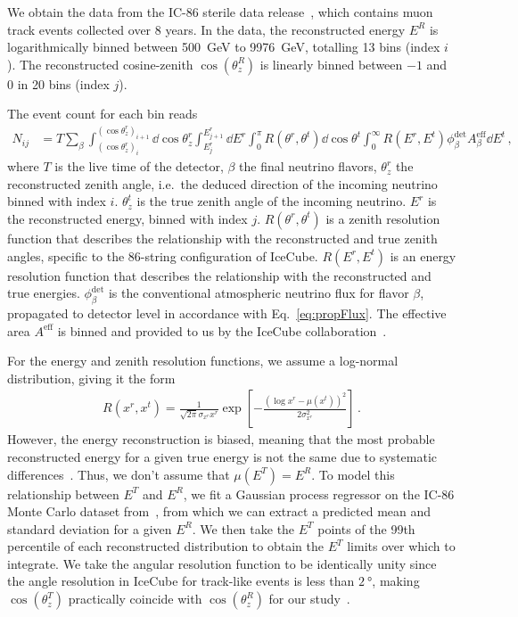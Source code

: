 \documentclass{article}
\newcommand{\zreco}{\ensuremath{\cos{(\theta_z^{R})}}}
\newcommand{\ztrue}{\ensuremath{\cos{(\theta_z^{T})}}}
\newcommand{\Ereco}{E^{R}}
\newcommand{\Etrue}{E^{T}}
\begin{document}
We obtain the data from the IC-86 sterile data release~\cite{IC2020}, which contains muon track events collected over 8 years. 
In the data, the reconstructed energy $\Ereco$ is logarithmically binned between \SI{500}{\GeV} to \SI{9976}{\GeV}, totalling 13 bins (index $i$).
The reconstructed cosine-zenith $\zreco$ is linearly binned between $-1$ and $0$ in 20 bins (index $j$). 

The event count for each bin reads
\begin{align}\label{eq:ICevents}
    N_{ij} &= T \sum_\beta\int_{(\cos{\theta_z^r})_i}^{(\cos{\theta_z^r})_{i+1}} \dd \cos{\theta^r_z} \int_{E^r_{j}}^{E^r_{j+1}} \dd E^r 
    \int_0^\pi R(\theta^r,\theta^t) \dd \cos{\theta^t} \int_0^\infty R(E^r,E^t) \phi_\beta^\text{det}  A^\text{eff}_\beta \dd E^t
    \,,
\end{align}
where $T$ is the live time of the detector, $\beta$ the final neutrino flavors, $\theta_z^r$ the reconstructed 
zenith angle, i.e.~the deduced direction of the incoming neutrino binned with index $i$. $\theta^t_z$ is the true zenith angle of the incoming neutrino. 
$E^r$ is the reconstructed energy, binned with index $j$. $R(\theta^r,\theta^t)$ is a zenith resolution function 
that describes the relationship with the reconstructed and true zenith angles, specific to the 86-string configuration of IceCube.
$R(E^r,E^t)$ is an energy resolution function 
that describes the relationship with the reconstructed and true energies. $\phi_\beta^\text{det}$ is the conventional atmospheric neutrino flux for flavor $\beta$, propagated to detector level
in accordance with Eq.~\ref{eq:propFlux}. The effective area $A^\text{eff}$ is binned and provided to us by the IceCube collaboration~\cite{ICaeff}.

For the energy and zenith resolution functions, we assume a log-normal distribution, giving it the form 
\begin{align}
    R(x^r, x^t) = \frac{1}{\sqrt{2\pi} \sigma_{x^r}x^r} \exp\left[-\frac{(\log x^r-\mu(x^t))^2}{2\sigma_{x^r}^2}\right]\,.
\end{align}
However, the energy reconstruction is biased, meaning that the most probable reconstructed energy for a given true energy is not the same due to 
systematic differences~\cite{weaverThesis}. Thus, we don't assume that $\mu(\Etrue) =\Ereco$. 
To model this relationship between $\Etrue$ and $\Ereco$, we fit a Gaussian process regressor on the IC-86 Monte Carlo dataset from~\cite{IC2016}, from which
we can extract a predicted mean and standard deviation for a given $\Ereco$. We then take the $\Etrue$ points of the 99th percentile of each reconstructed
distribution to obtain the $\Etrue$ limits over which to integrate. We take the angular resolution function to be identically unity since the angle resolution in IceCube for track-like 
events is less than $\SI{2}{\degree}$, making $\ztrue$ practically coincide with $\zreco$ for our study~\cite{IC2020}. 
\end{document}

